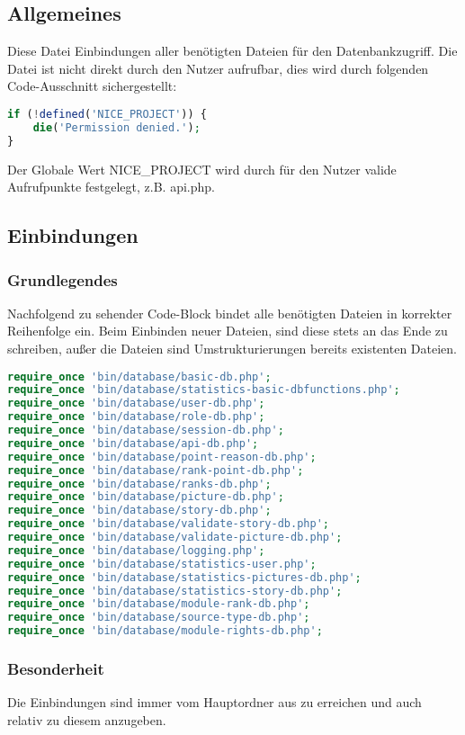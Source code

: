 \subsection{Allgemeines} Diese Datei Einbindungen aller benötigten Dateien für den Datenbankzugriff.
Die Datei ist nicht direkt durch den Nutzer aufrufbar, dies wird durch folgenden Code-Ausschnitt sichergestellt:
\begin{lstlisting}[language=php]
if (!defined('NICE_PROJECT')) {
	die('Permission denied.');
}
\end{lstlisting}
Der Globale Wert {\glqq NICE\_PROJECT\grqq} wird durch für den Nutzer valide Aufrufpunkte festgelegt, z.B. {\glqq api.php\grqq}.
\newpage
\subsection{Einbindungen}
\subsubsection{Grundlegendes}
Nachfolgend zu sehender Code-Block bindet alle benötigten Dateien in korrekter Reihenfolge ein. Beim Einbinden neuer Dateien, sind diese stets an das Ende zu schreiben, außer die Dateien sind Umstrukturierungen bereits existenten Dateien.
\begin{lstlisting}[language=php]
require_once 'bin/database/basic-db.php';
require_once 'bin/database/statistics-basic-dbfunctions.php';
require_once 'bin/database/user-db.php';
require_once 'bin/database/role-db.php';
require_once 'bin/database/session-db.php';
require_once 'bin/database/api-db.php';
require_once 'bin/database/point-reason-db.php';
require_once 'bin/database/rank-point-db.php';
require_once 'bin/database/ranks-db.php';
require_once 'bin/database/picture-db.php';
require_once 'bin/database/story-db.php';
require_once 'bin/database/validate-story-db.php';
require_once 'bin/database/validate-picture-db.php';
require_once 'bin/database/logging.php';
require_once 'bin/database/statistics-user.php';
require_once 'bin/database/statistics-pictures-db.php';
require_once 'bin/database/statistics-story-db.php';
require_once 'bin/database/module-rank-db.php';
require_once 'bin/database/source-type-db.php';
require_once 'bin/database/module-rights-db.php';
\end{lstlisting}
\subsubsection{Besonderheit}
Die Einbindungen sind immer vom Hauptordner aus zu erreichen und auch relativ zu diesem anzugeben.
